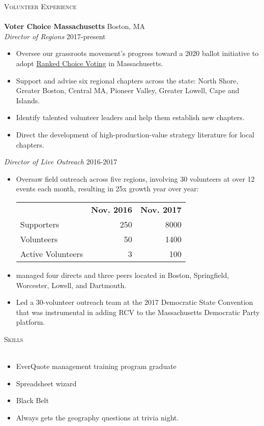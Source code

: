 \documentclass[a4paper,10pt]{article}
\newcommand{\lineunder} {
    \vspace*{-8pt} \\
    \hspace*{-18pt} \hrulefill \\
}
\newcommand{\header} [1] {
    {\hspace*{-18pt}\vspace*{6pt} \textsc{#1}}
    \vspace*{-6pt} \lineunder
}
\begin{document}
\header{Volunteer Experience}
\textbf{Voter Choice Massachusetts} \hfill Boston, MA\\
\textit{Director of Regions} \hfill 2017-present\\
\begin{itemize} \itemsep -1pt
\item Oversee our grassroots movement's progress toward a 2020 ballot initiative to adopt 
  \href{http://www.fairvote.org/rcv}{Ranked Choice Voting} in Massachusetts.
\item Support and advise six regional chapters across the state: North
  Shore, Greater Boston, Central MA, Pioneer Valley, Greater Lowell, Cape and Islands.
\item Identify talented volunteer leaders and help them establish new
  chapters.
\item Direct the development of high-production-value strategy literature
  for local chapters.
  \end{itemize}
\textit{Director of Live Outreach} \hfill 2016-2017\\
  \begin{itemize} \itemsep -2pt
  \item Oversaw field outreach across five regions, involving 30 volunteers at over 12 events each month, resulting in 25x growth year over year:\
  \begin{tabular*}{\textwidth}{l r r}
   & \textbf{Nov. 2016} & \textbf{Nov. 2017}\\
  Supporters & 250 & 8000\\
  Volunteers & 50 & 1400\\
  Active Volunteers & 3 & 100\\
  \end{tabular*}
  \item managed four directs and three peers located in Boston, Springfield, Worcester, Lowell, and Dartmouth.\\
  \item Led a 30-volunteer outreach team at the 2017 Democratic State Convention that was instrumental in adding RCV to the Massachusetts Democratic Party platform.
  \end{itemize}

\header{Skills}
\begin{itemize} \itemsep -2pt
    \item EverQuote management training program graduate
    \item Spreadsheet wizard
    \item Black Belt
    \item Always gets the geography questions at trivia night.
    \end{itemize}
\end{document}
